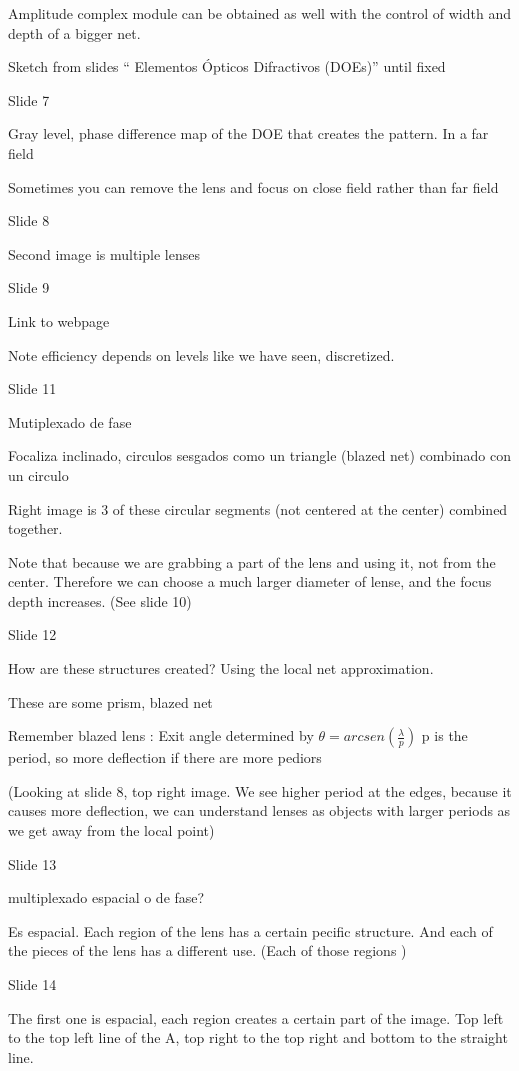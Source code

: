 \documentclass[../main/main.tex]{subfiles}
\begin{document}
Amplitude complex module can be obtained as well with the control of width and depth of a bigger net.




Sketch from slides  `` Elementos Ópticos Difractivos (DOEs)'' until fixed


Slide 7

Gray level, phase difference map of the DOE that creates the pattern. In a far field

Sometimes you can remove the lens and focus on close field rather than far field

Slide 8

Second image is multiple lenses

Slide 9

Link to webpage

Note efficiency depends on levels like we have seen, discretized.


Slide 11


Mutiplexado de fase

Focaliza inclinado, circulos sesgados como un triangle (blazed net) combinado con un circulo

Right image is 3 of these circular segments (not centered at the center) combined together.

Note that because we are grabbing a part of the lens and using it, not from the center. Therefore we can choose a much larger diameter of lense, and the focus depth increases. (See slide 10)


Slide 12

How are these structures created? Using the local net approximation.

These are some prism,  blazed net

Remember blazed lens : Exit angle determined by $\theta = arcsen (\frac \lambda p)$ p is the period, so more deflection if there are more pediors

(Looking at slide 8, top right image. We see higher period at the edges, because it causes more deflection, we can understand lenses as objects with larger periods as we get away from the local point)

Slide 13

multiplexado espacial o de fase?

Es espacial. Each region of the lens has a certain pecific structure. And each of the pieces of the lens has a different use. (Each of those regions )

Slide 14

The first one is espacial, each region creates a certain part of the image. Top left to the top left line of the A, top right to the top right and bottom to the straight line.
\end{document}
